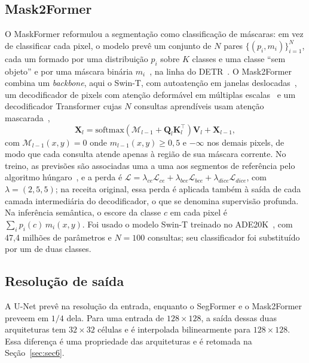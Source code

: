 \documentclass[final,5p,times,twocolumn]{elsarticle}
\begin{document}
\subsection{Mask2Former}\label{subsec:mask2former}

O MaskFormer reformulou a segmentação como classificação de máscaras: em vez de classificar cada pixel, o modelo prevê um conjunto de $N$ pares $\{(p_i,m_i)\}_{i=1}^N$, cada um formado por uma distribuição $p_i$ sobre $K$ classes e uma classe ``sem objeto'' e por uma máscara binária $m_i$~\cite{cheng2021maskformer}, na linha do DETR~\cite{carion2020detr}. O Mask2Former combina um \textit{backbone}, aqui o Swin-T, com autoatenção em janelas deslocadas~\cite{liu2021swin}, um decodificador de pixels com atenção deformável em múltiplas escalas~\cite{zhu2021deformable} e um decodificador Transformer cujas $N$ consultas aprendíveis usam atenção mascarada~\cite{cheng2022mask2former},
\begin{equation}\label{eq:maskedattn}
\mathbf{X}_l=\mathrm{softmax}(\mathcal{M}_{l-1}+\mathbf{Q}_l\mathbf{K}_l^\top)\mathbf{V}_l+\mathbf{X}_{l-1},
\end{equation}
com $\mathcal{M}_{l-1}(x,y)=0$ onde $m_{l-1}(x,y)\geq 0,5$ e $-\infty$ nos demais pixels, de modo que cada consulta atende apenas à região de sua máscara corrente. No treino, as previsões são associadas uma a uma aos segmentos de referência pelo algoritmo húngaro~\cite{kuhn1955}, e a perda é $\mathcal{L}=\lambda_{ce}\mathcal{L}_{ce}+\lambda_{bce}\mathcal{L}_{bce}+\lambda_{dice}\mathcal{L}_{dice}$, com $\lambda=(2,5,5)$; na receita original, essa perda é aplicada também à saída de cada camada intermediária do decodificador, o que se denomina supervisão profunda. Na inferência semântica, o escore da classe $c$ em cada pixel é $\sum_i p_i(c)\,m_i(x,y)$. Foi usado o modelo Swin-T treinado no ADE20K~\cite{zhou2017ade}, com 47,4 milhões de parâmetros e $N=100$ consultas; seu classificador foi substituído por um de duas classes.

\subsection{Resolução de saída}\label{subsec:outres}

A U-Net prevê na resolução da entrada, enquanto o SegFormer e o Mask2Former preveem em $1/4$ dela. Para uma entrada de $128\times128$, a saída dessas duas arquiteturas tem $32\times32$ células e é interpolada bilinearmente para $128\times128$. Essa diferença é uma propriedade das arquiteturas e é retomada na Seção~\ref{sec:sec6}.
\end{document}
